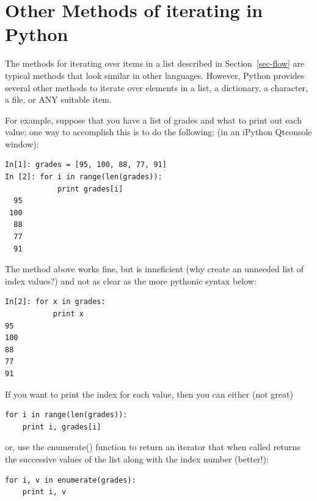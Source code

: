 \section{Other Methods of iterating in Python}
\label{sec-iterating}
The methods for iterating over items in a list described in Section~\ref{sec-flow} are typical methods that look similar in other languages. However, Python provides several other methods to iterate over elements in a list, a dictionary, a character, a file, or ANY suitable item. 

For example, suppose that you have a list of grades and what to print out each value; one way to accomplish this is to do the following: (in an iPython Qtconsole window):
\begin{lstlisting}
In[1]: grades = [95, 100, 88, 77, 91]
In [2]: for i in range(len(grades)):
            print grades[i]   
  95
 100
  88
  77
  91
\end{lstlisting}
The method above works fine, but is inneficient (why create an unneeded list of index values?) and not as clear as
the more pythonic syntax below:
\begin{lstlisting}
In[2]: for x in grades:
           print x
95
100
88
77
91
\end{lstlisting}
If you want to print the index for each value, then you can either (not great)
\begin{lstlisting}
for i in range(len(grades)):
    print i, grades[i] 	
\end{lstlisting}
or, use the enumerate() function to return an iterator that when called returns the successive
values of the list along with the index number (better!):
\begin{lstlisting}
for i, v in enumerate(grades):
    print i, v
\end{lstlisting}

